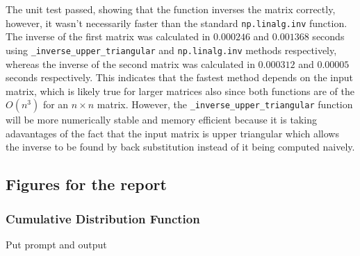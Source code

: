 \documentclass[12pt]{article}
\begin{document}
    The unit test passed, showing that the function inverses the matrix correctly, however, it wasn't necessarily faster than the standard \texttt{np.linalg.inv} function.
    The inverse of the first matrix was calculated in $0.000246$ and $0.001368$ seconds using \texttt{\_inverse\_upper\_triangular} and \texttt{np.linalg.inv} methods respectively, whereas the inverse of the second matrix was calculated in $0.000312$ and $0.00005$ seconds respectively.
    This indicates that the fastest method depends on the input matrix, which is likely true for larger matrices also since both functions are of the $O(n^3)$ for an $n \times n$ matrix.
    However, the \texttt{\_inverse\_upper\_triangular} function will be more numerically stable and memory efficient because it is taking adavantages of the fact that the input matrix is upper triangular which allows the inverse to be found by back substitution instead of it being computed naively.
    \FloatBarrier

    \subsection{Figures for the report}
    \subsubsection{Cumulative Distribution Function}
    Put prompt and output


    \printbibliography
\end{document}
